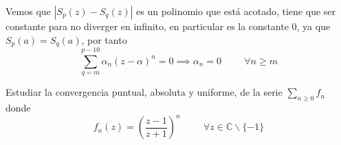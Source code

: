 Vemos que $|S_p(z)-S_q(z)|$ es un polinomio que está acotado, tiene que ser constante para no diverger en infinito, en particular es la constante $0$, ya que $S_p(a)=S_q(a)$, por tanto $$\sum_{q=m}^{p-10} \alpha_n (z-\alpha)^n = 0 \implies  \alpha_n=0 \hspace{1cm}\forall n\geq m$$ %



\begin{ejer}
	Estudiar la convergencia puntual, absoluta y uniforme, de la serie $\sum_{n\geq 0} f_n$ donde
	$$ f_n(z) = \left( \frac{z-1}{z+1} \right)^n\hspace{1cm} \forall z\in\mathbb{C}\backslash\{-1\} $$
\end{ejer}

\begin{comment}
Idea:

llamar w a (w-1)/(z-1), y mirar cuando la función tiene imagen que cae en el disco de centro 0 y radio 1, afinar para saber cuando un subconjunto de C po esta función cae dentro de un subconjunto compacto donde el sumatorio converja
\end{comment}
